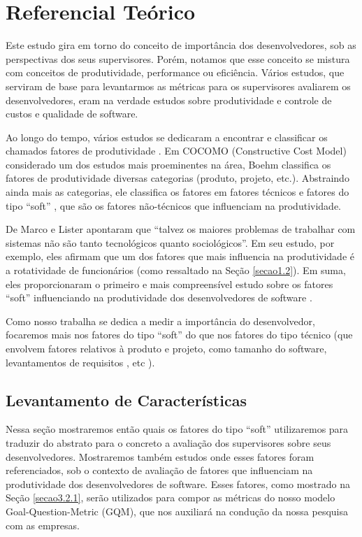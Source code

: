 \chapter[Referencial Teórico]{Referencial Teórico}

Este estudo gira em torno do conceito de importância dos desenvolvedores, sob as perspectivas dos seus supervisores. Porém, notamos que esse conceito se mistura com conceitos de produtividade, performance ou eficiência. Vários estudos, que serviram de base para levantarmos as métricas para os supervisores avaliarem os desenvolvedores, eram na verdade estudos sobre produtividade e controle de custos e qualidade de software.

Ao longo do tempo, vários estudos se dedicaram a encontrar e classificar os chamados fatores de produtividade \cite{Vosburgh1984, Walston1977,Brooks1981,Hanson1985,Jones1986,Boehm1988,Jones1997,Scudder1991,Banker1991,Boehm1984,Banker1987,Scacchi1995,Briand1998,Jones2000,Lokan2001,Clincy2003,Wagner2008,deBarrosSampaio2010}. Em COCOMO \cite{Boehm2000} (Constructive Cost Model) considerado um dos estudos mais proeminentes na área, Boehm classifica os fatores de produtividade diversas categorias (produto, projeto, etc.). Abstraindo ainda mais as categorias, ele classifica os fatores em fatores técnicos e fatores do tipo “soft” \cite{Wagner2008}, que são os fatores não-técnicos que influenciam na produtividade.

De Marco e Lister \cite{DeMarco1987} apontaram que “talvez os maiores problemas de trabalhar com sistemas não são tanto tecnológicos quanto sociológicos”. Em seu estudo, por exemplo, eles afirmam que um dos fatores que mais influencia na produtividade é a rotatividade de funcionários (como ressaltado na Seção \ref{secao1.2}). Em suma, eles proporcionaram o primeiro e mais compreensível estudo sobre os fatores “soft” influenciando na produtividade dos desenvolvedores de software \cite{Wagner2008}.

Como nosso trabalha se dedica a medir a importância do desenvolvedor, focaremos mais nos fatores do tipo “soft” do que nos fatores do tipo técnico (que envolvem fatores relativos à produto e projeto, como tamanho do software, levantamentos de requisitos , etc \cite{deBarrosSampaio2010}).

\section{Levantamento de Características}\label{referencial_levantamento}
Nessa seção mostraremos então quais os fatores do tipo “soft” utilizaremos para traduzir do abstrato para o concreto a avaliação dos supervisores sobre seus desenvolvedores. Mostraremos também estudos onde esses fatores foram referenciados, sob o contexto de avaliação de fatores que influenciam na produtividade dos desenvolvedores de software. Esses fatores, como mostrado na Seção \ref{secao3.2.1}, serão utilizados para compor as métricas do nosso modelo Goal-Question-Metric (GQM), que nos auxiliará na condução da nossa pesquisa com as empresas. 

